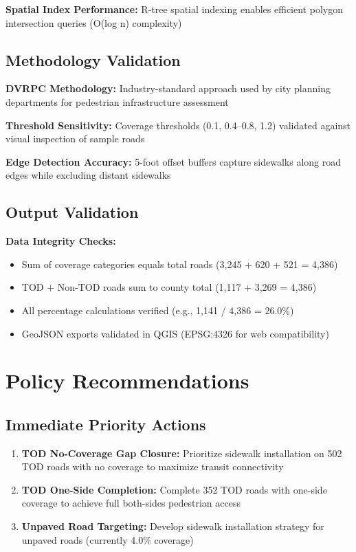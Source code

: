 \documentclass[11pt,letterpaper]{article}
\begin{document}
\textbf{Spatial Index Performance:} R-tree spatial indexing enables efficient polygon intersection queries (O(log n) complexity)

\subsection{Methodology Validation}

\textbf{DVRPC Methodology:} Industry-standard approach used by city planning departments for pedestrian infrastructure assessment

\textbf{Threshold Sensitivity:} Coverage thresholds (0.1, 0.4--0.8, 1.2) validated against visual inspection of sample roads

\textbf{Edge Detection Accuracy:} 5-foot offset buffers capture sidewalks along road edges while excluding distant sidewalks

\subsection{Output Validation}

\textbf{Data Integrity Checks:}
\begin{itemize}
    \item Sum of coverage categories equals total roads (3,245 + 620 + 521 = 4,386)
    \item TOD + Non-TOD roads sum to county total (1,117 + 3,269 = 4,386)
    \item All percentage calculations verified (e.g., 1,141 / 4,386 = 26.0\%)
    \item GeoJSON exports validated in QGIS (EPSG:4326 for web compatibility)
\end{itemize}

\section{Policy Recommendations}

\subsection{Immediate Priority Actions}

\begin{enumerate}
    \item \textbf{TOD No-Coverage Gap Closure:} Prioritize sidewalk installation on 502 TOD roads with no coverage to maximize transit connectivity
    \item \textbf{TOD One-Side Completion:} Complete 352 TOD roads with one-side coverage to achieve full both-sides pedestrian access
    \item \textbf{Unpaved Road Targeting:} Develop sidewalk installation strategy for unpaved roads (currently 4.0\% coverage)
\end{enumerate}
\end{document}
